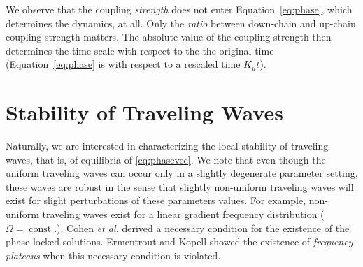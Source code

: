 \documentclass[aps,pre,twocolumn,a4paper,showkeys,showpacs]{revtex4}\usepackage{color}
\theoremstyle{plain}
\theoremstyle{plain}
\begin{document}
We observe that the coupling \emph{strength} does not enter
Equation~\eqref{eq:phase}, which determines the dynamics, at all. Only the
\emph{ratio} between down-chain and up-chain coupling strength matters. The
absolute value of the coupling strength then determines the time scale with
respect to the the original time (Equation~\eqref{eq:phase} is with respect to
a rescaled time $K_{u}t$).

\section{Stability of Traveling Waves}

\label{sec:mi}Naturally, we are interested in characterizing the local
stability of traveling waves, that is, of equilibria of \eqref{eq:phasevec}.
We note that even though the uniform traveling waves can occur only in a
slightly degenerate parameter setting, these waves are robust in the sense
that slightly non-uniform traveling waves will exist for slight perturbations
of these parameters values. For example, non-uniform traveling waves exist for
a linear gradient frequency distribution ($\Omega=\operatorname{const}.$).
Cohen \emph{et al.} \cite{cohen1982ncs} derived a necessary condition for the
existence of the phase-locked solutions. Ermentrout and Kopell
\cite{ermentrout1984fpc} showed the existence of \emph{frequency plateaus}
when this necessary condition is violated.
\end{document}
